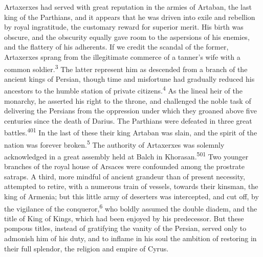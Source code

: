 
Artaxerxes had served with great reputation in the armies of
Artaban, the last king of the Parthians, and it appears that he
was driven into exile and rebellion by royal ingratitude, the
customary reward for superior merit. His birth was obscure, and
the obscurity equally gave room to the aspersions of his enemies,
and the flattery of his adherents. If we credit the scandal of
the former, Artaxerxes sprang from the illegitimate commerce of a
tanner’s wife with a common soldier.\textsuperscript{3} The latter represent him
as descended from a branch of the ancient kings of Persian,
though time and misfortune had gradually reduced his ancestors to
the humble station of private citizens.\textsuperscript{4} As the lineal heir of
the monarchy, he asserted his right to the throne, and challenged
the noble task of delivering the Persians from the oppression
under which they groaned above five centuries since the death of
Darius. The Parthians were defeated in three great battles.\textsuperscript{401}
In the last of these their king Artaban was slain, and the spirit
of the nation was forever broken.\textsuperscript{5} The authority of Artaxerxes
was solemnly acknowledged in a great assembly held at Balch in
Khorasan.\textsuperscript{501} Two younger branches of the royal house of Arsaces
were confounded among the prostrate satraps. A third, more
mindful of ancient grandeur than of present necessity, attempted
to retire, with a numerous train of vessels, towards their
kinsman, the king of Armenia; but this little army of deserters
was intercepted, and cut off, by the vigilance of the conqueror,\textsuperscript{6}
who boldly assumed the double diadem, and the title of King of
Kings, which had been enjoyed by his predecessor. But these
pompous titles, instead of gratifying the vanity of the Persian,
served only to admonish him of his duty, and to inflame in his
soul the ambition of restoring in their full splendor, the
religion and empire of Cyrus.

